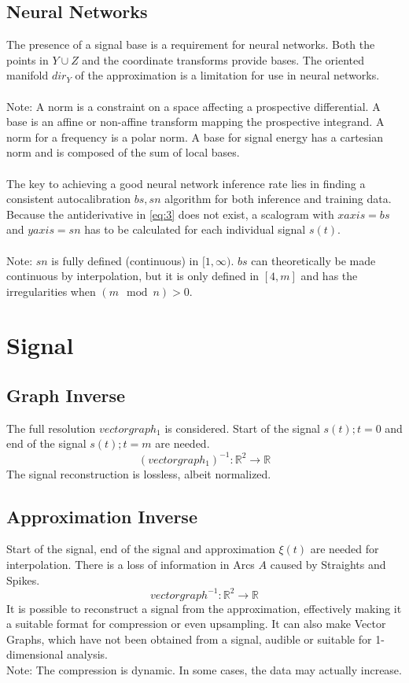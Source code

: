 \documentclass{report}
\begin{document}
\section{Neural Networks}
The presence of a signal base is a requirement for neural networks. Both the points in $Y\cup Z$ and the coordinate transforms provide bases. The oriented manifold $dir_{Y}$ of the approximation is a limitation for use in neural networks.\\\\
Note: A norm is a constraint on a space affecting a prospective differential. A base is an affine or non-affine transform mapping the prospective integrand. A norm for a frequency is a polar norm. A base for signal energy has a cartesian norm and is composed of the sum of local bases.\\\\
The key to achieving a good neural network inference rate lies in finding a consistent autocalibration $bs,sn$ algorithm for both inference and training data. Because the antiderivative in \eqref{eq:3} does not exist, a scalogram with $xaxis=bs$ and $yaxis=sn$ has to be calculated for each individual signal $s(t)$.\\\\
Note: $sn$ is fully defined (continuous) in $[1,\infty)$. $bs$ can theoretically be made continuous by interpolation, but it is only defined in $[4,m]$ and has the irregularities when $(m\mod n) > 0$.

\chapter{Signal}
\section{Graph Inverse}
The full resolution $vectorgraph_{1}$ is considered. Start of the signal $s(t);t=0$ and end of the signal $s(t);t=m$ are needed.
\begin{equation}
(vectorgraph_{1})^{-1}: \mathbb{R}^2 \rightarrow \mathbb{R}
\end{equation}
The signal reconstruction is lossless, albeit normalized.
\section{Approximation Inverse}
Start of the signal, end of the signal and approximation $\xi(t)$ are needed for interpolation. There is a loss of information in Arcs $A$ caused by Straights and Spikes.
\begin{equation}
vectorgraph^{-1}: \mathbb{R}^2 \rightarrow \mathbb{R}
\end{equation}
It is possible to reconstruct a signal from the approximation, effectively making it a suitable format for compression or even upsampling. It can also make Vector Graphs, which have not been obtained from a signal, audible or suitable for 1-dimensional analysis.\\
Note: The compression is dynamic. In some cases, the data may actually increase.
\end{document}

